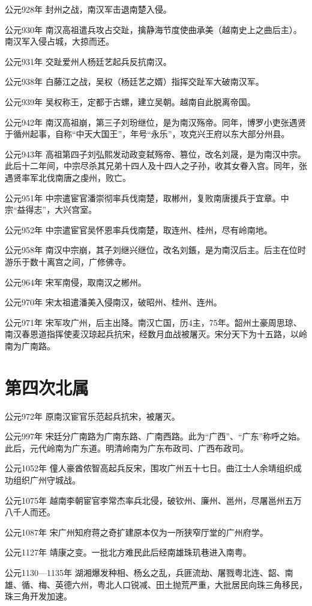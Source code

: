 公元928年 封州之战，南汉军击退南楚入侵。

公元930年 南汉高祖遣兵攻占交趾，擒静海节度使曲承美（越南史上之曲后主）。南汉军入侵占城，大掠而还。

公元931年 交趾爱州人杨廷艺起兵反抗南汉。

公元938年 白藤江之战，吴权（杨廷艺之婿）指挥交趾军大破南汉军。

公元939年 吴权称王，定都于古螺，建立吴朝。越南自此脱离帝国。

公元942年 南汉高祖崩，第三子刘玢继位，是为南汉殇帝。同年，博罗小吏张遇贤于循州起事，自称“中天大国王”，年号“永乐”，攻克兴王府以东大部分州县。

公元943年 高祖第四子刘弘熙发动政变弑殇帝、篡位，改名刘晟，是为南汉中宗。此后十二年间，中宗尽杀其兄弟十四人及十四人之子孙，收其女眷入宫。同年，张遇贤率军北伐南唐之虔州，败亡。

公元951年 中宗遣宦官潘崇彻率兵伐南楚，取郴州，复败南唐援兵于宜章。中宗“益得志”，大兴宫室。

公元952年 中宗遣宦官吴怀恩率兵伐南楚，取连州、桂州，尽有岭南地。

公元958年 南汉中宗崩，其子刘继兴继位，改名刘鋹，是为南汉后主。后主在位时游乐于数十离宫之间，广修佛寺。

公元964年 宋军南侵，取南汉之郴州。

公元970年 宋太祖遣潘美入侵南汉，破昭州、桂州、连州。

公元971年 宋军攻广州，后主出降。南汉亡国，历4主，75年。韶州土豪周思琼、南汉春恩道指挥使麦汉琼起兵抗宋，经数月血战被屠灭。宋分天下为十五路，以岭南为广南路。

\section*{第四次北属}

公元972年 原南汉宦官乐范起兵抗宋，被屠灭。

公元997年 宋廷分广南路为广南东路、广南西路。此为“广西”、“广东”称呼之始。此后，元代岭南为广东道。明清岭南为广东布政司、广西布政司。

公元1052年 僮人豪酋侬智高起兵反宋，围攻广州五十七日。曲江士人余靖组织成功组织广州守城战。

公元1075年 越南李朝宦官李常杰率兵北侵，破钦州、廉州、邕州，尽屠邕州五万八千人而还。

公元1087年 宋广州知府蒋之奇扩建原本仅为一所狭窄厅堂的广州府学。

公元1127年 靖康之变。一批北方难民此后经南雄珠玑巷进入南粤。

公元1130—1135年 湖湘爆发种相、杨幺之乱，兵匪流劫、屠戮粤北连、韶、南雄、循、梅、英德六州，粤北人口锐减、田土抛荒严重，大批居民向珠三角移民，珠三角开发加速。

